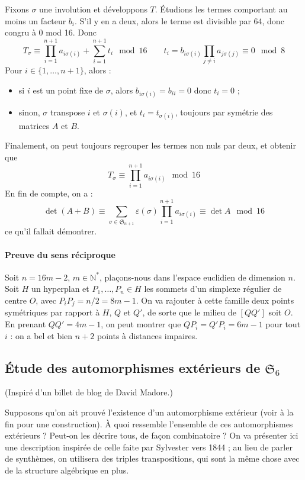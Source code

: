 \documentclass[a4paper, 11pt]{article}
\def\N{\mathbb{N}}
\def\Sigmap{\mathfrak{S}}
\begin{document}
Fixons $\sigma$ une involution et développons $T$. Étudions les termes
comportant au moins un facteur $b_i$. S'il y en a deux, alors le terme est
divisible par 64, donc congru à 0 mod 16. Donc
\[ T_\sigma \equiv \prod_{i=1}^{n+1} a_{i \sigma(i)} + \sum_{i=1}^{n+1} t_i
  \mod 16 \qquad t_i = b_{i \sigma(i)} \prod_{j \neq i} a_{j \sigma(j)}
  \equiv 0 \mod 8 \]
Pour $i \in \{1, \ldots, n+1\}$, alors :
\begin{itemize}
\item si $i$ est un point fixe de $\sigma$, alors $b_{i \sigma(i)} = b_{ii} = 0$
  donc $t_i = 0$ ;
\item sinon, $\sigma$ transpose $i$ et $\sigma(i)$, et $t_i = t_{\sigma(i)}$,
  toujours par symétrie des matrices $A$ et $B$.
\end{itemize}
Finalement, on peut toujours regrouper les termes non nuls par deux, et obtenir
que
\[ T_\sigma \equiv \prod_{i=1}^{n+1} a_{i \sigma(i)} \mod 16 \]
En fin de compte, on a :
\[ \det(A+B) \equiv \sum_{\sigma \in \Sigmap_{n+1}} \varepsilon(\sigma)
  \prod_{i=1}^{n+1} a_{i \sigma(i)} \equiv \det A \mod 16 \]
ce qu'il fallait démontrer.

\paragraph{Preuve du sens réciproque}

Soit $n = 16m - 2$, $m \in \N^*$, plaçons-nous dans l'espace euclidien de
dimension $n$. Soit $H$ un hyperplan et $P_1, \ldots, P_n \in H$ les sommets
d'un simplexe régulier de centre $O$, avec $P_iP_j = n/2 = 8m-1$. On va rajouter
à cette famille deux points symétriques par rapport à $H$, $Q$ et $Q'$, de sorte
que le milieu de $[QQ']$ soit $O$. En prenant $QQ' = 4m - 1$, on peut montrer
que $QP_i = Q'P_i = 6m - 1$ pour tout $i$ : on a bel et bien $n+2$ points à
distances impaires.


\newpage


\subsection{Étude des automorphismes extérieurs de $\Sigmap_6$}

(Inspiré d'un billet de blog de David Madore.)

Supposons qu'on ait prouvé l'existence d'un automorphisme extérieur (voir à la
fin pour une construction). À quoi ressemble l'ensemble de ces automorphismes
extérieurs ? Peut-on les décrire tous, de façon combinatoire ? On va présenter
ici une description inspirée de celle faite par Sylvester vers 1844 ; au lieu de
parler de synthèmes, on utilisera des triples transpositions, qui sont la même
chose avec de la structure algébrique en plus.
\end{document}
